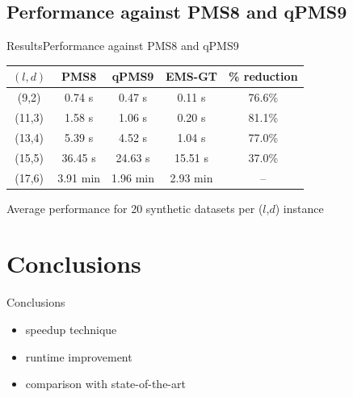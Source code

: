 \documentclass[pdf,xcolor={dvipsnames}]{beamer}
\begin{document}
	\subsection{Performance against PMS8 and qPMS9}
	\begin{frame}{Results}{Performance against PMS8 and qPMS9}

		\begin{table}[ht] %
			\small
			\renewcommand{\arraystretch}{1.3}
			\label{tbl:runtimes_v_pms}
			\centering
			\begin{tabular}{|c|c|c|c|c|}
			\hline \bfseries{\boldmath $(l,d)$} & \bfseries PMS8 & \bfseries qPMS9 & \bfseries EMS-GT & \bfseries \% reduction\\
			\hline
			 (9,2) &  0.74 s  &  0.47 s & {\color{blue} 0.11 s} & 76.6\%\\
			(11,3) &  1.58 s  &  1.06 s & {\color{blue} 0.20 s} & 81.1\%\\
			(13,4) &  5.39 s  &  4.52 s & {\color{blue} 1.04 s} & 77.0\%\\
			(15,5) & 36.45 s  & 24.63 s & {\color{blue}15.51 s} & 37.0\%\\
			(17,6) &  3.91 min & {\color{blue}1.96 min} & {2.93 min} & --\\
			\hline\end{tabular}
			\end{table}

		{\centering \footnotesize Average performance for 20 synthetic datasets per ($l$,$d$) instance \\}

		\end{frame}

\section{Conclusions}
	\begin{frame}{Conclusions}
		\begin{itemize}
		\item speedup technique
		\item runtime improvement
		\item comparison with state-of-the-art
		\end{itemize}
		\end{frame}
\end{document}

